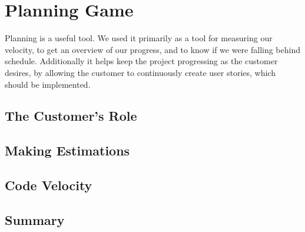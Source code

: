 \section{Planning Game}
Planning is a useful tool.
We used it primarily as a tool for measuring our velocity, to get an overview of our progress, and to know if we were falling behind schedule.
Additionally it helps keep the project progressing as the customer desires, by allowing the customer to continuously create user stories, which should be implemented.

\subsection{The Customer's Role}

\subsection{Making Estimations}

\subsection{Code Velocity}

\subsection{Summary}
